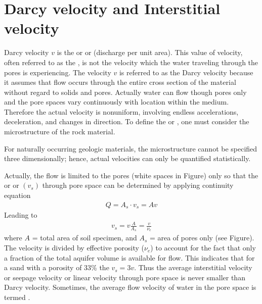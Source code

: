 \documentclass[letterpaper,10pt,english]{jupyterBook}
\let\sphinxpxdimen\pdfpxdimen\else\newdimen\sphinxpxdimen
\begin{document}
\section{Darcy velocity and Interstitial velocity}
\label{\detokenize{content/flow/L4/14_darcy_law_K:darcy-velocity-and-interstitial-velocity}}
\sphinxAtStartPar
Darcy velocity \(v\) is the  or  or  (discharge per
unit area). This value of velocity, often referred to as the , is not the
velocity which the water traveling through the pores is experiencing. The velocity \(v\) is
referred to as the Darcy velocity because it assumes that flow occurs through the entire cross section of the material without regard to solids and pores. Actually water can flow
though pores only and the pore spaces vary continuously with location within the
medium. Therefore the actual velocity is nonuniform, involving endless accelerations,
deceleration, and changes in direction. To define the  or , one must consider the microstructure of the rock material.

\sphinxAtStartPar
For naturally occurring geologic materials, the microstructure cannot be specified three\sphinxhyphen{}
dimensionally; hence, actual velocities can only be quantified statistically.

\noindent{\hspace*{\fill}\sphinxincludegraphics[height=255\sphinxpxdimen]{{L4_f8}.png}\hspace*{\fill}}

\sphinxAtStartPar
Actually, the flow is limited to the pores (white spaces in Figure) only so that the
 or  or  \((v_s)\) through pore space
can be determined by applying continuity equation
\begin{equation*}
\begin{split}
Q = A_s\cdot v_s = Av
\end{split}
\end{equation*}
\sphinxAtStartPar
Leading to
\begin{equation*}
\begin{split}
v_s = v\frac{A}{A_s} = \frac{v}{\nu_e}
\end{split}
\end{equation*}
\sphinxAtStartPar
where \(A\) = total area of soil specimen, and \(A_s\) = area of pores only (see Figure). The velocity
is divided by effective porosity (\(\nu_e\)) to account for the fact that only a fraction of the total aquifer
volume is available for flow. This indicates that for a sand with a porosity of 33\% the \(v_s
= 3 v\). Thus the average interstitial velocity or seepage velocity or linear velocity through
pore space is never smaller than Darcy velocity. Sometimes, the average flow velocity of
water in the pore space is termed .
\end{document}
